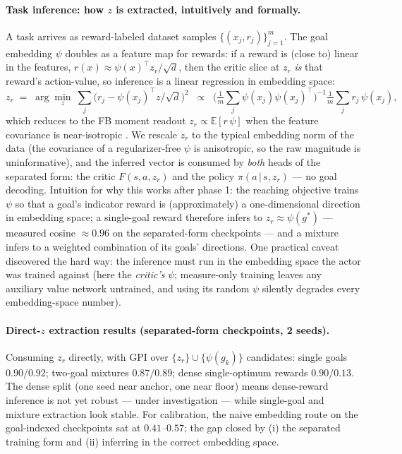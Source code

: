 \documentclass[10pt]{article}
\newcommand{\E}{\mathbb{E}}
\begin{document}
\paragraph{Task inference: how $z$ is extracted, intuitively and formally.}
A task arrives as reward-labeled dataset samples $\{(x_j, r_j)\}_{j=1}^{m}$.
The goal embedding $\psi$ doubles as a feature map for rewards: if a reward is (close
to) linear in the features, $r(x)\approx \psi(x)^{\top}z_r/\sqrt{d}$, then the critic
slice at $z_r$ \emph{is} that reward's action-value, so inference is a linear
regression in embedding space:
\[
z_r \;=\; \arg\min_{z}\ \sum_j \big(r_j - \psi(x_j)^{\top}z/\sqrt{d}\big)^2
\;\;\propto\;\; \Big(\tfrac{1}{m}\sum_j \psi(x_j)\psi(x_j)^{\top}\Big)^{-1}
\tfrac{1}{m}\sum_j r_j\,\psi(x_j),
\]
which reduces to the FB moment readout $z_r\propto\E[r\,\psi]$ when the feature
covariance is near-isotropic \citep{touati2021learning}.
We rescale $z_r$ to the typical embedding norm of the data (the covariance of a
regularizer-free $\psi$ is anisotropic, so the raw magnitude is uninformative), and the
inferred vector is consumed by \emph{both} heads of the separated form: the critic
$F(s,a,z_r)$ and the policy $\pi(a\,|\,s,z_r)$ --- no goal decoding.
Intuition for why this works after phase 1: the reaching objective trains $\psi$ so
that a goal's indicator reward is (approximately) a one-dimensional direction in
embedding space; a single-goal reward therefore infers to $z_r\approx\psi(g^{*})$ ---
measured cosine $\approx 0.96$ on the separated-form checkpoints --- and a mixture
infers to a weighted combination of its goals' directions.
One practical caveat discovered the hard way: the inference must run in the embedding
space the actor was trained against (here the \emph{critic's} $\psi$; measure-only
training leaves any auxiliary value network untrained, and using its random $\psi$
silently degrades every embedding-space number).

\paragraph{Direct-$z$ extraction results (separated-form checkpoints, 2 seeds).}
Consuming $z_r$ directly, with GPI over $\{z_r\}\cup\{\psi(g_k)\}$ candidates:
single goals $0.90/0.92$; two-goal mixtures $0.87/0.89$; dense single-optimum rewards
$0.90/0.13$.
The dense split (one seed near anchor, one near floor) means dense-reward inference is
not yet robust --- under investigation --- while single-goal and mixture extraction
look stable.
For calibration, the naive embedding route on the goal-indexed checkpoints sat at
$0.41$--$0.57$; the gap closed by (i) the separated training form and (ii) inferring in
the correct embedding space.
\end{document}

